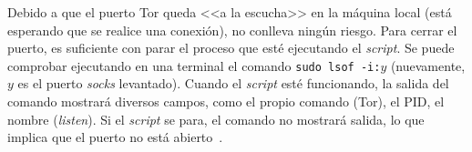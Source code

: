 Debido a que el puerto Tor queda <<a la escucha>> en la máquina local (está esperando que se realice una conexión), no conlleva ningún riesgo. Para cerrar el puerto, es suficiente con parar el proceso que esté ejecutando el \textit{script}. Se puede comprobar ejecutando en una terminal el comando \texttt{sudo lsof -i:$y$} (nuevamente, $y$ es el puerto \textit{socks} levantado). Cuando el \textit{script} esté funcionando, la salida del comando mostrará diversos campos, como el propio comando (Tor), el PID, el nombre (\textit{listen}). Si el \textit{script} se para, el comando no mostrará salida, lo que implica que el puerto no está abierto~\cite{checkOpenTorPorts}.